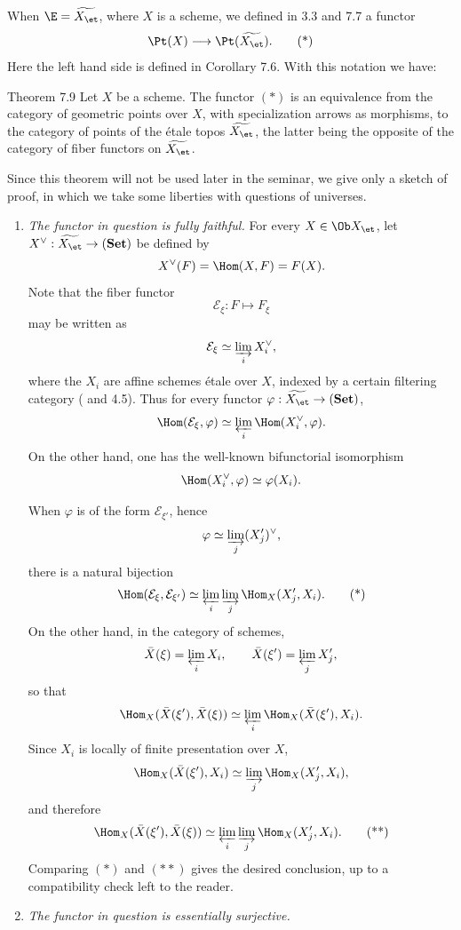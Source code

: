 When \(\E=\widetilde{X_{\et}}\), where \(X\) is a scheme, we defined in 3.3 and 7.7 a functor
\[
\Pt(X)\longrightarrow \Pt(\widetilde{X_{\et}}).
\tag{*}
\]
Here the left hand side is defined in Corollary 7.6. With this notation we have:

\begin{statement}{Theorem 7.9}
Let \(X\) be a scheme. The functor \((*)\) is an equivalence from the category of geometric points over \(X\), with specialization arrows as morphisms, to the category of points of the \'etale topos \(\widetilde{X_{\et}}\), the latter being the opposite of the category of fiber functors on \(\widetilde{X_{\et}}\).
\end{statement}

Since this theorem will not be used later in the seminar, we give only a sketch of proof, in which we take some liberties with questions of universes.

\begin{enumerate}[label=\alph*)]
\item \emph{The functor in question is fully faithful.} For every \(X\in\Ob X_{\et}\), let \(X^\vee:\widetilde{X_{\et}}\to(\mathbf{Set})\) be defined by
\[
X^\vee(F)=\Hom(X,F)=F(X).
\]
Note that the fiber functor
\[
\mathcal E_\xi:F\longmapsto F_\xi
\]
may be written as
\[
\mathcal E_\xi\simeq \varinjlim_i X_i^\vee,
\]
where the \(X_i\) are affine schemes \'etale over \(X\), indexed by a certain filtering category ( and 4.5). Thus for every functor \(\varphi:\widetilde{X_{\et}}\to(\mathbf{Set})\),
\[
\Hom(\mathcal E_\xi,\varphi)\simeq \varprojlim_i\Hom(X_i^\vee,\varphi).
\]
On the other hand, one has the well-known bifunctorial isomorphism
\[
\Hom(X_i^\vee,\varphi)\simeq\varphi(X_i).
\]

When \(\varphi\) is of the form \(\mathcal E_{\xi'}\), hence
\[
\varphi\simeq\varinjlim_j (X'_j)^\vee,
\]
there is a natural bijection
\[
\Hom(\mathcal E_\xi,\mathcal E_{\xi'})\simeq
\varprojlim_i\varinjlim_j\Hom_X(X'_j,X_i).
\tag{*}
\]
On the other hand, in the category of schemes,
\[
\bar X(\xi)=\varprojlim_i X_i,
\qquad
\bar X(\xi')=\varprojlim_j X'_j,
\]
so that
\[
\Hom_X(\bar X(\xi'),\bar X(\xi))\simeq
\varprojlim_i\Hom_X(\bar X(\xi'),X_i).
\]
Since \(X_i\) is locally of finite presentation over \(X\),
\[
\Hom_X(\bar X(\xi'),X_i)\simeq
\varinjlim_j\Hom_X(X'_j,X_i),
\]
and therefore
\[
\Hom_X(\bar X(\xi'),\bar X(\xi))\simeq
\varprojlim_i\varinjlim_j\Hom_X(X'_j,X_i).
\tag{**}
\]
Comparing \((*)\) and \((**)\) gives the desired conclusion, up to a compatibility check left to the reader.

\item \emph{The functor in question is essentially surjective.}
\end{enumerate}

